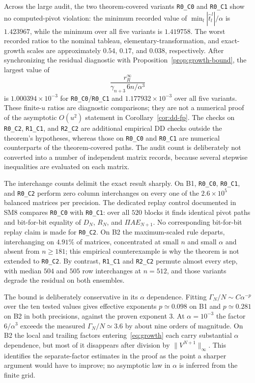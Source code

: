 \documentclass[review,onefignum,onetabnum]{siamart251216}
\begin{document}
Across the large audit, the two theorem-covered variants \texttt{R0\_C0} and \texttt{R0\_C1}
show no computed-pivot violation: the minimum recorded value of
$\min_l|\hat t_l^{\,l}|/\alpha$ is $1.423967$, while the minimum over all five variants is
$1.419758$.
The worst recorded ratios to the nominal tableau, elementary-transformation, and exact-growth
scales are approximately $0.54$, $0.17$, and $0.038$, respectively. After synchronizing the
residual diagnostic with Proposition~\ref{prop:growth-bound}, the largest value of
\[
\frac{r_R^\infty}{\gamma_{n+3}\,6n/\alpha^3}
\]
is $1.000394\times10^{-3}$ for \texttt{R0\_C0}/\texttt{R0\_C1} and
$1.177932\times10^{-3}$ over all five variants. These finite-$u$ ratios are diagnostic comparisons;
they are not a numerical proof of the asymptotic $O(u^2)$ statement in Corollary~\ref{cor:dd-fp}.
The checks on \texttt{R0\_C2}, \texttt{R1\_C1}, and \texttt{R2\_C2} are additional empirical DD
checks outside the theorem's hypotheses, whereas those on \texttt{R0\_C0} and \texttt{R0\_C1}
are numerical counterparts of the theorem-covered paths. The audit count is deliberately not
converted into a number of independent matrix records, because several stepwise inequalities are
evaluated on each matrix.

The interchange counts delimit the exact result sharply. On B1, \texttt{R0\_C0},
\texttt{R0\_C1}, and \texttt{R0\_C2} perform zero column interchanges on every one of the
$2.6\times10^5$ balanced matrices per precision. The dedicated replay control documented in SM8
compares \texttt{R0\_C0} with \texttt{R0\_C1}: over all $520$ blocks it finds identical pivot
paths and bit-for-bit equality of $D_N$, $R_N$, and $\Pi AE_{N+1}$. No corresponding bit-for-bit
replay claim is made for \texttt{R0\_C2}. On B2 the maximum-scaled rule departs, interchanging on
$4.91\%$ of matrices, concentrated at small $n$ and small $\alpha$ and absent from $n\ge181$;
this empirical counterexample is why the theorem is not extended to \texttt{R0\_C2}. By contrast,
\texttt{R1\_C1} and \texttt{R2\_C2} permute almost every step, with median $504$ and $505$ row
interchanges at $n=512$, and those variants degrade the residual on both ensembles.

The bound is deliberately conservative in its $\alpha$ dependence. Fitting
$\Gamma_N/N\sim C\alpha^{-p}$ over the ten tested values gives effective exponents
$p\simeq0.098$ on B1 and $p\simeq0.281$ on B2 in both precisions, against the proven exponent $3$.
At $\alpha=10^{-3}$ the factor $6/\alpha^3$ exceeds the measured $\Gamma_N/N\simeq3.6$ by about
nine orders of magnitude. On B2 the local and trailing factors entering~\eqref{eq:growth} each
carry substantial $\alpha$ dependence, but most of it disappears after division by
$\|V^{N+1}\|_\infty$. This identifies the separate-factor estimates in the proof as the point a
sharper argument would have to improve; no asymptotic law in $\alpha$ is inferred from the finite
grid.
\end{document}
